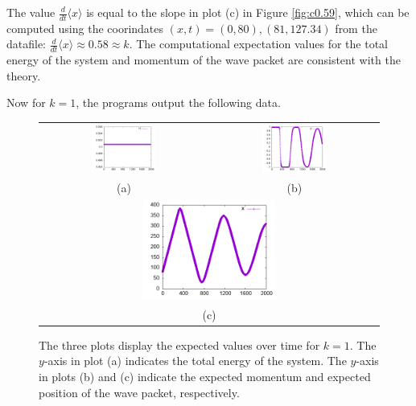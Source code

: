 \documentclass[letterpaper,12pt]{article}
\begin{document}
    The value $\frac{d}{dt} \langle x \rangle$ is equal to the slope in plot (c)
    in Figure
    \ref{fig:c0.59}, which can be computed using the coorindates $(x, t)
    = (0, 80), (81, 127.34)$ from the datafile: $\frac{d}{dt} \langle x \rangle
    \approx 0.58 \approx k$. The computational expectation values for the total
    energy of the
    system and momentum of the wave packet are consistent with the theory.

    \pagebreak

    Now for $k = 1$, the programs output the following data.

    \begin{figure}[H]
        \centering
        \begin{tabular}{cc}
            \includegraphics[width=0.4\textwidth]{Hc1.png}
            &
            \includegraphics[width=0.4\textwidth]{pc1.png}
            \\
            (a) & (b)
            \\
            \multicolumn{2}{c}{\includegraphics[width=0.4\textwidth]{xc1.png}}
            \\
            \multicolumn{2}{c}{(c)}
        \end{tabular}
        \caption[Expected Values over Time for $k = 1$]{The three plots display
        the expected values over time for $k =
        1$. The $y$-axis in plot (a) indicates the total energy of
        the system. The $y$-axis in plots (b) and (c) indicate the
        expected momentum and expected position of the wave packet,
        respectively.}
        \label{fig:c1}
    \end{figure}
\end{document}

